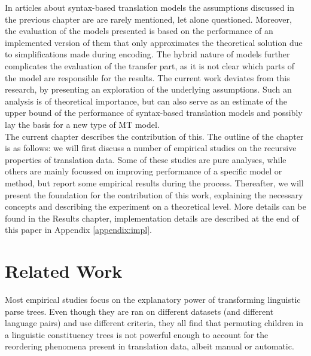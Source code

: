 \documentclass[a4paper, 11pt]{report}
\theoremstyle{definition}
\theoremstyle{plain}
\begin{document}
In articles about syntax-based translation models the assumptions discussed in the previous chapter are are rarely mentioned, let alone questioned. Moreover, the evaluation of the models presented is based on the performance of an implemented version of them that only approximates the theoretical solution due to simplifications made during encoding. The hybrid nature of models further complicates the evaluation of the transfer part, as it is not clear which parts of the model are responsible for the results. The current work deviates from this research, by presenting an exploration of the underlying assumptions. Such an analysis is of theoretical importance, but can also serve as an estimate of the upper bound of the performance of syntax-based translation models and possibly lay the basis for a new type of MT model.\\
The current chapter describes the contribution of this. The outline of the chapter is as follows: we will first discuss a number of empirical studies on the recursive properties of translation data. Some of these studies are pure analyses, while others are mainly focussed on improving performance of a specific model or method, but report some empirical results during the process. Thereafter, we will present the foundation for the contribution of this work, explaining the necessary concepts and describing the experiment on a theoretical level. More details can be found in the Results chapter, implementation details are described at the end of this paper in Appendix \ref{appendix:impl}.

\section{Related Work}

Most empirical studies focus on the explanatory power of transforming linguistic parse trees. Even though they are ran on different datasets (and different language pairs) and use different criteria, they all find that permuting children in a linguistic constituency trees is not powerful enough to account for the reordering phenomena present in translation data, albeit manual or automatic.
\end{document}
